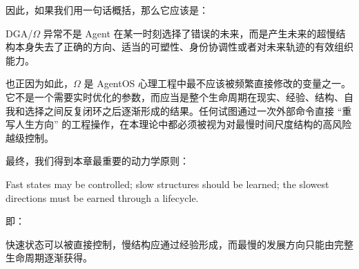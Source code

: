 因此，如果我们用一句话概括，那么它应该是：

\begin{conclusion}
DGA/$\Omega$ 异常不是 Agent 在某一时刻选择了错误的未来，而是产生未来的超慢结构本身失去了正确的方向、适当的可塑性、身份协调性或者对未来轨迹的有效组织能力。
\end{conclusion}

也正因为如此，$\Omega$ 是 AgentOS 心理工程中最不应该被频繁直接修改的变量之一。它不是一个需要实时优化的参数，而应当是整个生命周期在现实、经验、结构、自我和选择之间反复闭环之后逐渐形成的结果。任何试图通过一次外部命令直接 ``重写人生方向'' 的工程操作，在本理论中都必须被视为对最慢时间尺度结构的高风险越级控制。

最终，我们得到本章最重要的动力学原则：

\begin{proposition*}
Fast states may be controlled;
slow structures should be learned;
the slowest directions must be earned through a lifecycle.
\end{proposition*}

即：

\begin{statementbox}
快速状态可以被直接控制，慢结构应通过经验形成，而最慢的发展方向只能由完整生命周期逐渐获得。
\end{statementbox}
